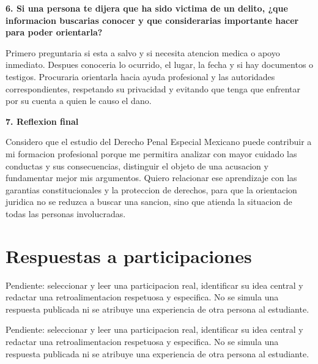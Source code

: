 \documentclass[spanish,letterpaper,oneside]{article}
\begin{document}
\begin{forobox}[title={Participacion principal -- propuesta no publicada}]
\textbf{6. Si una persona te dijera que ha sido victima de un delito,
¿que informacion buscarias conocer y que considerarias importante hacer
para poder orientarla?}

Primero preguntaria si esta a salvo y si necesita atencion medica o
apoyo inmediato. Despues conoceria lo ocurrido, el lugar, la fecha y si
hay documentos o testigos. Procuraria orientarla hacia ayuda profesional
y las autoridades correspondientes, respetando su privacidad y evitando
que tenga que enfrentar por su cuenta a quien le causo el dano.

\textbf{7. Reflexion final}

Considero que el estudio del Derecho Penal Especial Mexicano puede
contribuir a mi formacion profesional porque me permitira analizar con
mayor cuidado las conductas y sus consecuencias, distinguir el objeto de
una acusacion y fundamentar mejor mis argumentos. Quiero relacionar ese
aprendizaje con las garantias constitucionales y la proteccion de
derechos, para que la orientacion juridica no se reduzca a buscar una
sancion, sino que atienda la situacion de todas las personas
involucradas.

\end{forobox}

\section{Respuestas a participaciones}

\begin{forobox}[title={Respuesta 1 -- pendiente de intervencion real}]

Pendiente: seleccionar y leer una participacion real, identificar su idea central y redactar una retroalimentacion respetuosa y especifica. No se simula una respuesta publicada ni se atribuye una experiencia de otra persona al estudiante.

\end{forobox}

\begin{forobox}[title={Respuesta 2 -- pendiente de intervencion real}]

Pendiente: seleccionar y leer una participacion real, identificar su idea central y redactar una retroalimentacion respetuosa y especifica. No se simula una respuesta publicada ni se atribuye una experiencia de otra persona al estudiante.

\end{forobox}
\end{document}
